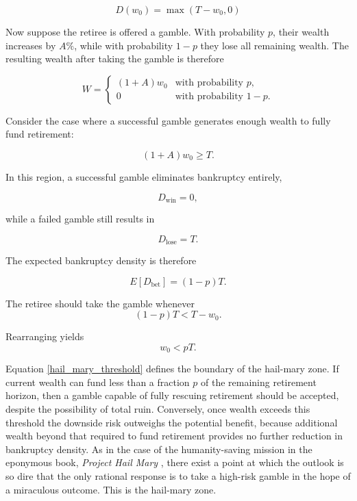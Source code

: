 \documentclass[11pt]{article}
\begin{document}
\begin{equation} \label{bankruptcy_years} 
  D(w_0) = \max(T - w_0, 0) 
\end{equation}

Now suppose the retiree is offered a gamble. With probability \(p\), their wealth increases by \(A\%\), while with probability \(1-p\) they lose all remaining wealth. The resulting wealth after taking the gamble is therefore 

\begin{equation} \label{hail_mary_gamble} 
  W = \begin{cases} 
    (1+A)w_0 & \text{with probability } p,\\ 
    0 & \text{with probability } 1-p. 
  \end{cases} 
\end{equation} 

Consider the case where a successful gamble generates enough wealth to fully fund retirement: 

\begin{equation} \label{complete_rescue} 
  (1+A)w_0 \geq T. 
\end{equation} 

In this region, a successful gamble eliminates bankruptcy entirely, 

\begin{equation} 
  D_{\text{win}} = 0, 
\end{equation} 

while a failed gamble still results in 

\begin{equation} 
  D_{\text{lose}} = T. 
\end{equation} 

The expected bankruptcy density is therefore 

\begin{equation} \label{expected_bankruptcy_complete} 
  E[D_{\text{bet}}] = (1-p)T. 
\end{equation}

The retiree should take the gamble whenever 
\begin{equation} \label{complete_rescue_condition} 
  (1-p)T < T - w_0. 
\end{equation} 

Rearranging yields 
\begin{equation} \label{hail_mary_threshold} 
  w_0 < pT. 
\end{equation} 

Equation \ref{hail_mary_threshold} defines the boundary of the hail-mary zone. If current wealth can fund less than a fraction \(p\) of the remaining retirement horizon, then a gamble capable of fully rescuing retirement should be accepted, despite the possibility of total ruin. Conversely, once wealth exceeds this threshold the downside risk outweighs the potential benefit, because additional wealth beyond that required to fund retirement provides no further reduction in bankruptcy density. As in the case of the humanity-saving mission in the eponymous book, \textit{Project Hail Mary} \parencite{hailMary}, there exist a point at which the outlook is so dire that the only rational response is to take a high-risk gamble in the hope of a miraculous outcome. This is the hail-mary zone.
\end{document}
